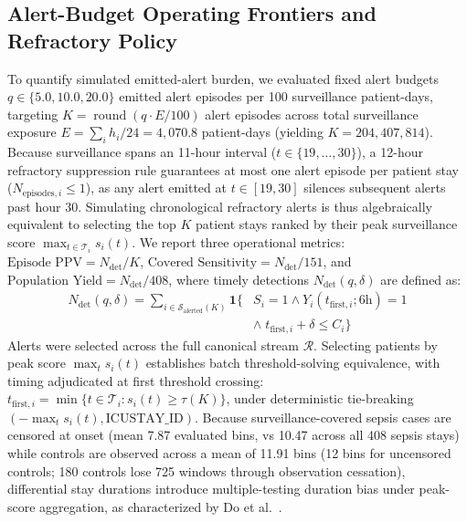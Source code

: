 \documentclass[10pt,twocolumn,a4paper]{article}
\begin{document}
\subsection{Alert-Budget Operating Frontiers and Refractory Policy}
To quantify simulated emitted-alert burden, we evaluated fixed alert budgets $q \in \{5.0, 10.0, 20.0\}$ emitted alert episodes per 100 surveillance patient-days, targeting $K = \operatorname{round}(q \cdot E / 100)$ alert episodes across total surveillance exposure $E = \sum_i h_i / 24 = 4,070.8$ patient-days (yielding $K=204, 407, 814$). Because surveillance spans an 11-hour interval ($t \in \{19, \dots, 30\}$), a 12-hour refractory suppression rule guarantees at most one alert episode per patient stay ($N_{\text{episodes}, i} \le 1$), as any alert emitted at $t \in [19, 30]$ silences subsequent alerts past hour 30. Simulating chronological refractory alerts is thus algebraically equivalent to selecting the top $K$ patient stays ranked by their peak surveillance score $\max_{t \in \mathcal{T}_i} s_i(t)$. We report three operational metrics: $\text{Episode PPV} = N_{\text{det}} / K$, $\text{Covered Sensitivity} = N_{\text{det}} / 151$, and $\text{Population Yield} = N_{\text{det}} / 408$, where timely detections $N_{\text{det}}(q, \delta)$ are defined as:
\begin{equation}
\begin{aligned}
N_{\text{det}}(q, \delta) = \sum_{i \in \mathcal{S}_{\text{alerted}}(K)} \mathbf{1} \bigl\{ & S_i = 1 \land Y_i(t_{\mathrm{first}, i}; 6\text{h}) = 1 \\
& \land \; t_{\mathrm{first}, i} + \delta \le C_i \bigr\}
\end{aligned}
\end{equation}
Alerts were selected across the full canonical stream $\mathcal{R}$. Selecting patients by peak score $\max_t s_i(t)$ establishes batch threshold-solving equivalence, with timing adjudicated at first threshold crossing: $t_{\mathrm{first}, i} = \min \{ t \in \mathcal{T}_i : s_i(t) \ge \tau(K) \}$, under deterministic tie-breaking $(-\max_{t} s_i(t), \text{ICUSTAY\_ID})$. Because surveillance-covered sepsis cases are censored at onset (mean 7.87 evaluated bins, vs 10.47 across all 408 sepsis stays) while controls are observed across a mean of 11.91 bins (12 bins for uncensored controls; 180 controls lose 725 windows through observation cessation), differential stay durations introduce multiple-testing duration bias under peak-score aggregation, as characterized by Do et al.~\cite{do2026continuous}.
\end{document}
